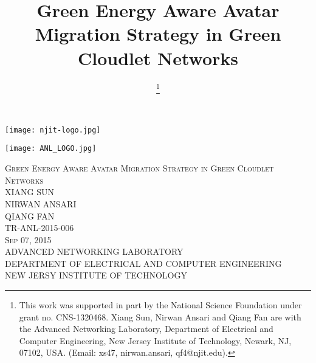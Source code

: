 \documentclass[journal,12pt,draftclsnofoot,onecolumn]{IEEEtran}
\begin{document}
\begin{titlepage}
\begin{center}
\vspace*{-2\baselineskip}
\begin{minipage}[l]{7cm}
\flushleft
\texttt{[image: njit-logo.jpg]}
\end{minipage}
\hfill
\begin{minipage}[r]{7cm}
\flushright
\texttt{[image: ANL\_LOGO.jpg]}
\end{minipage}

\vfill

\textsc{\LARGE Green Energy Aware Avatar Migration Strategy in Green Cloudlet Networks\\[12pt]}
\vfill
\textsc{\LARGE  XIANG SUN \\ NIRWAN ANSARI\\QIANG FAN}\\
\vfill
\textsc{\LARGE TR-ANL-2015-006\\[12pt]
\LARGE Sep 07, 2015}\\[1.5cm]
\vfill
{ADVANCED NETWORKING LABORATORY\\
 DEPARTMENT OF ELECTRICAL AND COMPUTER ENGINEERING\\
 NEW JERSY INSTITUTE OF TECHNOLOGY}
\end{center}
\end{titlepage}

\title{Green Energy Aware Avatar Migration Strategy in Green Cloudlet Networks}
\author{
\thanks{This work was supported in part by the National Science Foundation under grant no. CNS-1320468. Xiang Sun, Nirwan Ansari and Qiang Fan are with the Advanced Networking Laboratory, Department of Electrical and Computer Engineering, New Jersey Institute of Technology, Newark, NJ, 07102, USA. (Email: {xs47, nirwan.ansari, qf4}@njit.edu).}
}
\maketitle
\end{document}
